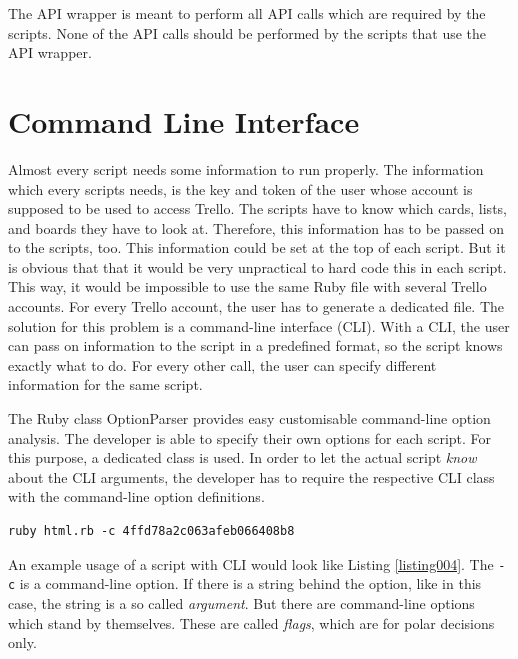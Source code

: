 The API wrapper is meant to perform all API calls which are required by the scripts. None of the API calls should be performed by the scripts that use the API wrapper.


\section{Command Line Interface}\label{cli}
Almost every script needs some information to run properly. The information which every scripts needs, is the key and token of the user whose account is supposed to be used to access Trello. The scripts have to know which cards, lists, and boards they have to look at. Therefore, this information has to be passed on to the scripts, too. This information could be set at the top of each script. But it is obvious that that it would be very unpractical to hard code this in each script. This way, it would be impossible to use the same Ruby file with several Trello accounts. For every Trello account, the user has to generate a dedicated file. The solution for this problem is a command-line interface (CLI). With a CLI, the user can pass on information to the script in a predefined format, so the script knows exactly what to do. For every other call, the user can specify different information for the same script.

The Ruby class OptionParser\cite{ruby:optionparser} provides easy customisable command-line option analysis. The developer is able to specify their own options for each script. For this purpose, a dedicated class is used. 
In order to let the actual script \emph{know} about the CLI arguments, the developer has to require the respective CLI class with the command-line option definitions.

\begin{lstlisting}[aboveskip=1\baselineskip, style=bash, caption=Example usage of a script with CLI., label=listing004]
ruby html.rb -c 4ffd78a2c063afeb066408b8
\end{lstlisting}

An example usage of a script with CLI would look like Listing \ref{listing004}. The \texttt{-c} is a command-line option. If there is a string behind the option, like in this case, the string is a so called \emph{argument}. But there are command-line options which stand by themselves. These are called \emph{flags}, which are for polar decisions only.

